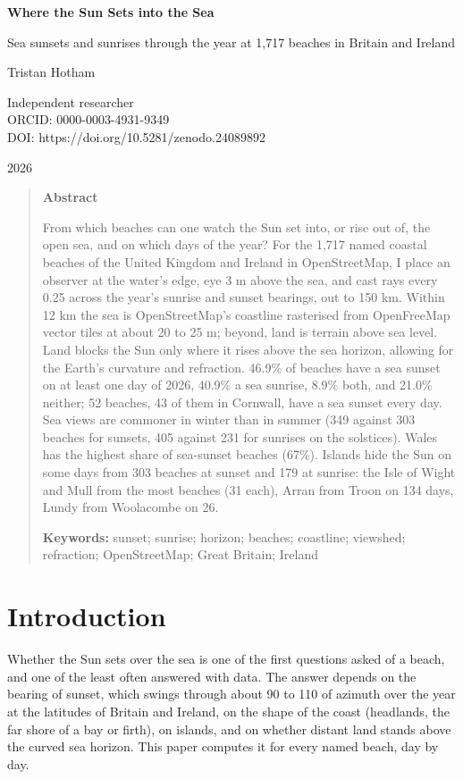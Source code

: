\documentclass[11pt,a4paper]{article}
\begin{document}
\begin{center}
{\Large\bfseries Where the Sun Sets into the Sea\par}
\vspace{0.4em}
{\large Sea sunsets and sunrises through the year at 1,717 beaches in Britain and Ireland\par}
\vspace{1.2em}
{\large Tristan Hotham\par}
\vspace{0.3em}
{\small Independent researcher\\
ORCID: 0000-0003-4931-9349\\
DOI: https://doi.org/10.5281/zenodo.24089892\par}
\vspace{0.8em}
2026
\end{center}

\begin{quote}
\small
\begin{center}\textbf{Abstract}\end{center}
From which beaches can one watch the Sun set into, or rise out of, the open sea, and on which days of the year? For the 1,717 named coastal beaches of the United Kingdom and Ireland in OpenStreetMap, I place an observer at the water's edge, eye 3 m above the sea, and cast rays every 0.25\textdegree{} across the year's sunrise and sunset bearings, out to 150 km. Within 12 km the sea is OpenStreetMap's coastline rasterised from OpenFreeMap vector tiles at about 20 to 25 m; beyond, land is terrain above sea level. Land blocks the Sun only where it rises above the sea horizon, allowing for the Earth's curvature and refraction. 46.9\% of beaches have a sea sunset on at least one day of 2026, 40.9\% a sea sunrise, 8.9\% both, and 21.0\% neither; 52 beaches, 43 of them in Cornwall, have a sea sunset every day. Sea views are commoner in winter than in summer (349 against 303 beaches for sunsets, 405 against 231 for sunrises on the solstices). Wales has the highest share of sea-sunset beaches (67\%). Islands hide the Sun on some days from 303 beaches at sunset and 179 at sunrise: the Isle of Wight and Mull from the most beaches (31 each), Arran from Troon on 134 days, Lundy from Woolacombe on 26.

\textbf{Keywords:} sunset; sunrise; horizon; beaches; coastline; viewshed; refraction; OpenStreetMap; Great Britain; Ireland
\end{quote}

\section{Introduction}
Whether the Sun sets over the sea is one of the first questions asked of a beach, and one of the least often answered with data. The answer depends on the bearing of sunset, which swings through about 90 to 110\textdegree{} of azimuth over the year at the latitudes of Britain and Ireland, on the shape of the coast (headlands, the far shore of a bay or firth), on islands, and on whether distant land stands above the curved sea horizon. This paper computes it for every named beach, day by day.
\end{document}
